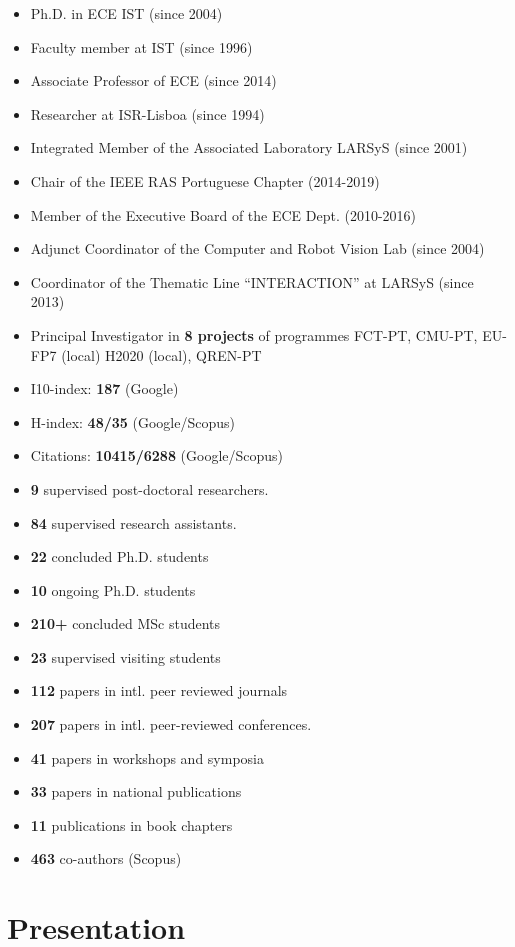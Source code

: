 \documentclass[
]{article}
\begin{document}
\begin{itemize}
\item
  Ph.D. in ECE IST (since 2004)
\item
  Faculty member at IST (since 1996)
\item
  Associate Professor of ECE (since 2014)
\item
  Researcher at ISR-Lisboa (since 1994)
\item
  Integrated Member of the Associated Laboratory LARSyS (since 2001)
\item
  Chair of the IEEE RAS Portuguese Chapter (2014-2019)
\item
  Member of the Executive Board of the ECE Dept. (2010-2016)
\item
  Adjunct Coordinator of the Computer and Robot Vision Lab (since 2004)
\item
  Coordinator of the Thematic Line ``INTERACTION'' at LARSyS (since
  2013)
\item
  Principal Investigator in \textbf{8 projects} of programmes FCT-PT,
  CMU-PT, EU-FP7 (local) H2020 (local), QREN-PT
\item
  I10-index: \textbf{187} (Google)
\item
  H-index: \textbf{48/35} (Google/Scopus)
\item
  Citations: \textbf{10415/6288} (Google/Scopus)
\item
  \textbf{9} supervised post-doctoral researchers.
\item
  \textbf{84} supervised research assistants.
\item
  \textbf{22} concluded Ph.D. students
\item
  \textbf{10} ongoing Ph.D. students
\item
  \textbf{210+} concluded MSc students
\item
  \textbf{23} supervised visiting students
\item
  \textbf{112} papers in intl. peer reviewed journals
\item
  \textbf{207} papers in intl. peer-reviewed conferences.
\item
  \textbf{41} papers in workshops and symposia
\item
  \textbf{33} papers in national publications
\item
  \textbf{11} publications in book chapters
\item
  \textbf{463} co-authors (Scopus)
\end{itemize}

\section{Presentation}\label{presentation}
\end{document}
